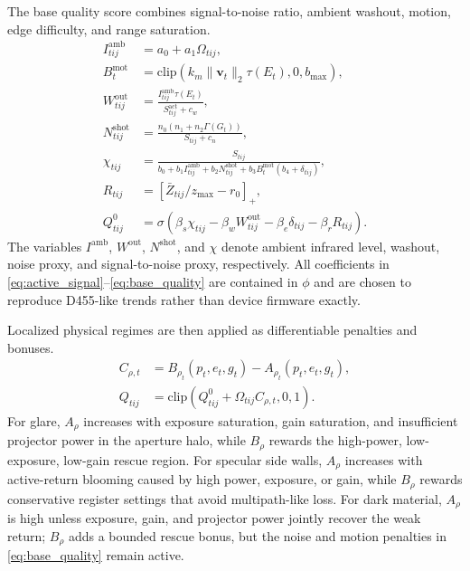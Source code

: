 \documentclass[letterpaper,journal]{IEEEtran}
\begin{document}
The base quality score combines signal-to-noise ratio, ambient washout,
motion, edge difficulty, and range saturation.
\begin{align}
    I^{\mathrm{amb}}_{tij}
    &=a_0+a_1\Omega_{tij},\\
    B^{\mathrm{mot}}_t
    &=\mathrm{clip}(k_m\|\mathbf{v}_t\|_2\tau(E_t),0,b_{\max}),\\
    W^{\mathrm{out}}_{tij}
    &=\frac{I^{\mathrm{amb}}_{tij}\tau(E_t)}
    {S^{\mathrm{act}}_{tij}+c_w},\\
    N^{\mathrm{shot}}_{tij}
    &=\frac{n_0(n_1+n_2\Gamma(G_t))}{S_{tij}+c_n},\\
    \chi_{tij}
    &=\frac{S_{tij}}
    {b_0+b_1I^{\mathrm{amb}}_{tij}
    +b_2N^{\mathrm{shot}}_{tij}
    +b_3B^{\mathrm{mot}}_t(b_4+\delta_{tij})},\\
    R_{tij}
    &=[\bar Z_{tij}/z_{\max}-r_0]_+,\\
    Q^{0}_{tij}
    &=\sigma\left(
    \beta_s\chi_{tij}
    -\beta_w W^{\mathrm{out}}_{tij}
    -\beta_e\delta_{tij}
    -\beta_rR_{tij}
    \right).
    \label{eq:base_quality}
\end{align}
The variables $I^{\mathrm{amb}}$, $W^{\mathrm{out}}$, $N^{\mathrm{shot}}$,
and $\chi$ denote ambient infrared level, washout, noise proxy, and
signal-to-noise proxy, respectively. All coefficients in
\eqref{eq:active_signal}--\eqref{eq:base_quality} are contained in
$\phi$ and are chosen to reproduce D455-like trends rather than device
firmware exactly.

Localized physical regimes are then applied as differentiable penalties and
bonuses.
\begin{align}
    C_{\rho,t}
    &=B_{\rho_t}(p_t,e_t,g_t)-A_{\rho_t}(p_t,e_t,g_t),\\
    Q_{tij}
    &=\mathrm{clip}\left(
    Q^{0}_{tij}+\Omega_{tij}C_{\rho,t},0,1\right).
    \label{eq:quality}
\end{align}
For glare, $A_{\rho}$ increases with exposure saturation, gain saturation,
and insufficient projector power in the aperture halo, while $B_{\rho}$
rewards the high-power, low-exposure, low-gain rescue region. For specular
side walls, $A_{\rho}$ increases with active-return blooming caused by high
power, exposure, or gain, while $B_{\rho}$ rewards conservative register
settings that avoid multipath-like loss. For dark material, $A_{\rho}$ is high
unless exposure, gain, and projector power jointly recover the weak return;
$B_{\rho}$ adds a bounded rescue bonus, but the noise and motion penalties in
\eqref{eq:base_quality} remain active.
\end{document}
